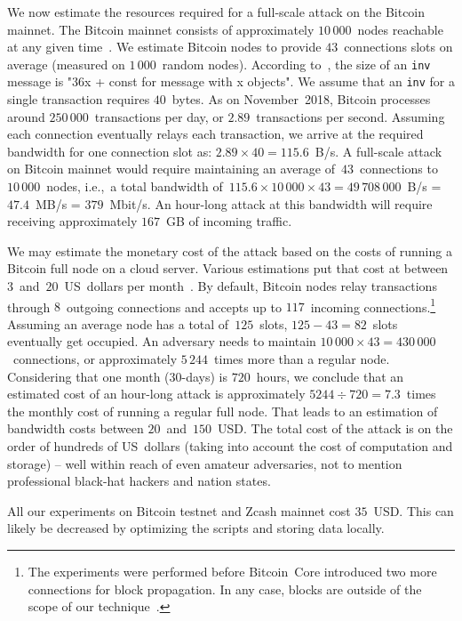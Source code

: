 We now estimate the resources required for a full-scale attack on the Bitcoin mainnet.
The Bitcoin mainnet consists of approximately $10\,000$~nodes reachable at any given time~\cite{Bitnodes}.
We estimate Bitcoin nodes to provide $43$~connections slots on average (measured on $1\,000$~random nodes).
According to~\cite{BitcoinWiki}, the size of an \texttt{inv} message is "36x + const for message with x objects".
We assume that an \texttt{inv} for a single transaction requires $40$~bytes.
As on November~2018, Bitcoin processes around $250\,000$~transactions per day, or $2.89$~transactions per second.
Assuming each connection eventually relays each transaction, we arrive at the required bandwidth for one connection slot as: $2.89 \times 40 = 115.6$~B/s.
A full-scale attack on Bitcoin mainnet would require maintaining an average of~$43$~connections to $10\,000$~nodes, i.e.,~a total bandwidth of~$115.6 \times 10\,000 \times 43 = 49\,708\,000$~B/s = $47.4$~MB/s = $379$~Mbit/s.
An hour-long attack at this bandwidth will require receiving approximately $167$~GB of incoming traffic.

We may estimate the monetary cost of the attack based on the costs of running a Bitcoin full node on a cloud server.
Various estimations put that cost at between $3$~and~$20$~US~dollars per month~\cite{Zeyde2018, Connell2017}.
By default, Bitcoin nodes relay transactions through $8$~outgoing connections and accepts up to $117$~incoming connections.\footnote{The experiments were performed before Bitcoin~Core introduced two more connections for block propagation. In any case, blocks are outside of the scope of our technique~\cite{Daftuar2019}.}
Assuming an average node has a total of~$125$~slots, $125 - 43 = 82$~slots eventually get occupied.
An adversary needs to maintain $10\,000 \times 43 = 430\,000$~connections, or approximately $5\,244$~times more than a regular node.
Considering that one month ($30$-days) is $720$~hours, we conclude that an estimated cost of an hour-long attack is approximately $5244 \div 720 = 7.3$~times the monthly cost of running a regular full node.
That leads to an estimation of bandwidth costs between $20$~and~$150$~USD\@.
The total cost of the attack is on the order of hundreds of US~dollars (taking into account the cost of computation and storage) -- well within reach of even amateur adversaries, not to mention professional black-hat hackers and nation states.

All our experiments on Bitcoin testnet and Zcash mainnet cost $35$~USD\@.
This can likely be decreased by optimizing the scripts and storing data locally.


